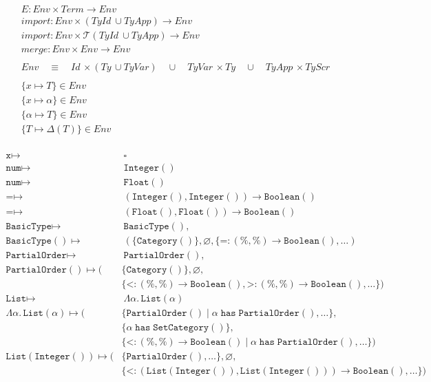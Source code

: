 \documentclass[10pt]{article}
\newcommand\Tup{\mathcal{T}}
\newcommand\Env{\textit{Env}}
\newcommand\Term{\textit{Term}}
\newcommand\Id{\textit{Id}}
\newcommand\Ty{\textit{Ty}}
\newcommand\TyId{\textit{TyId}}
\newcommand\TyApp{\textit{TyApp}}
\newcommand\TyVar{\textit{TyVar}}
\newcommand\TyScr{\textit{TyScr}}
\newcommand\Category{\texttt{Category}}
\newcommand\Thas{\mathrel{\texttt{has}}}
\newcommand\Mif{\mathrel{|}}
\newcommand\BasicType{\texttt{BasicType}}
\newcommand\PartialOrder{\texttt{PartialOrder}}
\newcommand\SetCategory{\texttt{SetCategory}}
\newcommand\Integer{\texttt{Integer}}
\newcommand\Float{\texttt{Float}}
\newcommand\Boolean{\texttt{Boolean}}
\newcommand\List{\texttt{List}}
\begin{document}
\begin{minipage}{\textwidth}
  \begin{gather*}
    E : \Env \times \Term \rightarrow \Env
    \\[0.5em]
    import : \Env \times (\TyId\ \cup \TyApp) \rightarrow \Env \\
    import : \Env \times \Tup(\TyId\ \cup \TyApp) \rightarrow \Env
    \\[0.5em]
    merge : \Env \times \Env \rightarrow \Env \\
    \\
    Env \quad \equiv \quad
      \Id\, \times (\Ty\, \cup \TyVar) \quad \cup \quad
      \TyVar\, \times \Ty \quad \cup \quad
      \TyApp\, \times \TyScr\\
    \\
    \{ x \mapsto T \} \in \Env \\
    \{ x \mapsto \alpha \} \in \Env \\
    \{ \alpha \mapsto T \} \in \Env \\
    \{ T \mapsto \Delta(T) \} \in \Env \\
  \end{gather*}

  \vspace{-2em}

  \begin{align*}
    \texttt{x} \mapsto &\ \square
    \\[0.5em]
    \texttt{num} \mapsto &\ \Integer() \\
    \texttt{num} \mapsto &\ \Float()
    \\[0.5em]
    \texttt{=} \mapsto &\ (\Integer(), \Integer()) \rightarrow \Boolean() \\
    \texttt{=} \mapsto &\ (\Float(), \Float()) \rightarrow \Boolean()
    \\[0.5em]
    \BasicType \mapsto &\ \BasicType(), \\
    \BasicType() \mapsto &\ ( \{ \Category() \}, \varnothing,
      \{ \texttt{=} : (\%,\%) \rightarrow \Boolean(), \ldots )
    \\[0.5em]
    \PartialOrder \mapsto &\ \PartialOrder(), \\
    \PartialOrder() \mapsto ( & \{ \Category() \}, \varnothing, \\
    & \{ \texttt{<} : (\%,\%) \rightarrow \Boolean(),
         \texttt{>} : (\%,\%) \rightarrow \Boolean(), \ldots \} )
    \\[0.5em]
    \List \mapsto &\ \Lambda \alpha.\,\List(\alpha) \\
    \Lambda \alpha.\, \List(\alpha) \mapsto ( &
      \{\PartialOrder() \Mif \alpha \Thas \PartialOrder(), \ldots \}, \\
    & \{ \alpha \Thas \SetCategory() \}, \\
    & \{ \texttt{<} : (\%,\%) \rightarrow \Boolean() \Mif \alpha \Thas
      \PartialOrder(), \ldots \} ) \\
    \List(\Integer()) \mapsto ( & \{ \PartialOrder(), \ldots \}, \varnothing, \\
    & \{ \texttt{<} : (\List(\Integer()),\List(\Integer())) \rightarrow
      \Boolean(), \ldots \} ) \\
  \end{align*}


\end{minipage}
\end{document}
